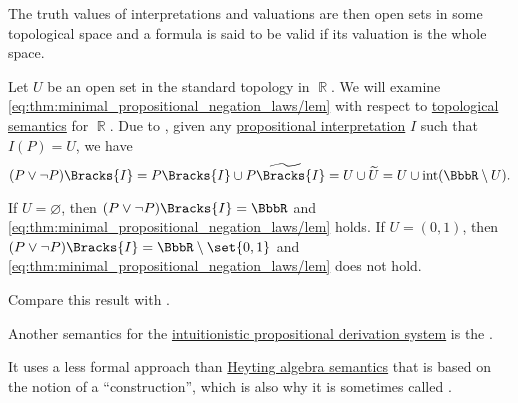 \begin{proposition}
\begin{proposition}
\begin{definition}
  The truth values of interpretations and valuations are then open sets in some topological space and a formula is said to be valid if its valuation is the whole space.
\end{definition}

\begin{example}\label{ex:topological_semantics_lem_counterexample}
  Let \( U \) be an open set in the standard topology in \( \BbbR \). We will examine \eqref{eq:thm:minimal_propositional_negation_laws/lem} with respect to \hyperref[def:propositional_topological_semantics]{topological semantics} for \( \BbbR \). Due to , given any \hyperref[def:propositional_valuation]{propositional interpretation} \( I \) such that \( I(P) = U \), we have
  \begin{equation*}
    (P \vee \neg P)\Bracks{I}
    =
    P\Bracks{I} \cup \widetilde{P\Bracks{I}}
    =
    U \cup \widetilde{U}
    =
    U \cup \inter(\BbbR \setminus U).
  \end{equation*}

  If \( U = \varnothing \), then \( (P \vee \neg P)\Bracks{I} = \BbbR \) and \eqref{eq:thm:minimal_propositional_negation_laws/lem} holds. If \( U = (0, 1) \), then \( (P \vee \neg P)\Bracks{I} = \BbbR \setminus \set{ 0, 1 } \) and \eqref{eq:thm:minimal_propositional_negation_laws/lem} does not hold.

  Compare this result with .
\end{example}

\begin{definition}\label{def:brouwer_heyting_kolmogorov_interpretation}
  Another semantics for the \hyperref[def:intuitionistic_propositional_derivation_system]{intuitionistic propositional derivation system} is the .

  It uses a less formal approach than \hyperref[def:propositional_heyting_algebra_semantics]{Heyting algebra semantics} that is based on the notion of a \enquote{construction}, which is also why it is sometimes called .


\end{definition}
\end{proposition}
\end{proposition}
